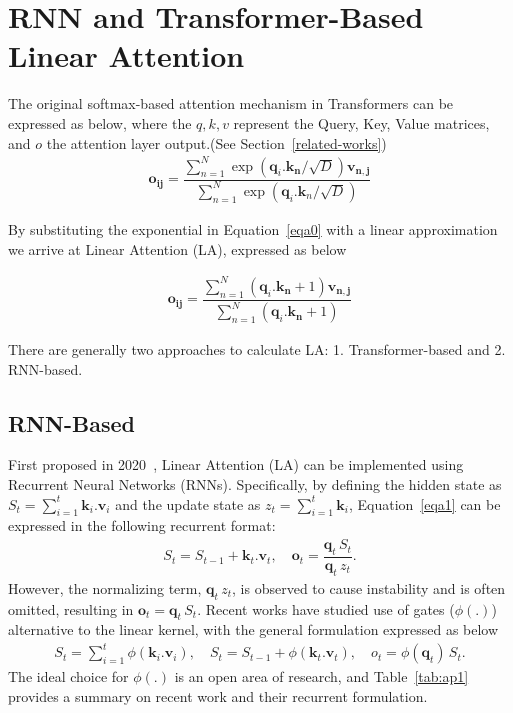 \newpage

\section{RNN and Transformer-Based Linear Attention}
\label{app:rnn}
The original softmax-based attention mechanism in Transformers can be expressed as below, where the $q,k,v$ represent the Query, Key, Value matrices, and $o$ the attention layer output.(See Section~\ref{related-works})
\begin{gather}
        \mathbf{o_{ij}} \!=\! \dfrac{\sum_{n=1}^{N}{\exp(\mathbf{q}_i.\mathbf{k_n}/\sqrt{D})\mathbf{v_{n,j}}}}{\sum_{n=1}^{N}{\exp(\mathbf{q}_i.\mathbf{k}_n/\sqrt{D})}}\label{eqa0}
\end{gather}

By substituting the exponential in Equation~\ref{eqa0} with a linear approximation we arrive at Linear Attention (LA), expressed as below

\begin{gather}
        \mathbf{o_{ij}} \!=\! \dfrac{\sum_{n=1}^{N}{(\mathbf{q}_i.\mathbf{k_n}+1)\mathbf{v_{n,j}}}}{\sum_{n=1}^{N}{(\mathbf{q}_i.\mathbf{k_n}+1)}}\label{eqa1}
\end{gather}

\par There are generally two approaches to calculate LA: 1. Transformer-based and 2. RNN-based.

\subsection{RNN-Based}
First proposed in 2020~\cite{pmlr-v119-katharopoulos20a}, Linear Attention (LA) can be implemented using Recurrent Neural Networks (RNNs). Specifically, by defining the hidden state as $S_t = \sum_{i=1}^t  \mathbf{k}_i.\mathbf{v}_i$ and the update state as $z_t = \sum_{i=1}^t  \mathbf{k}_i$, Equation~\ref{eqa1} can be expressed in the following recurrent format:
\begin{gather}
    S_t = S_{t-1} + \mathbf{k}_t.\mathbf{v}_t,\quad \mathbf{o}_t = \dfrac{\mathbf{q}_t\,S_t}{\mathbf{q}_t\,z_t}.
\end{gather}
However, the normalizing term, $\mathbf{q}_t\,z_t$, is observed to cause instability and is often omitted, resulting in $\mathbf{o}_t = \mathbf{q}_t\,S_t$. Recent works have studied use of gates ($\phi(.)$) alternative to the linear kernel, with the general formulation expressed as below
\begin{gather}
    S_t = \sum_{i=1}^t \phi({\mathbf{k}_i}.\mathbf{v}_i),\quad S_t = S_{t-1} +\phi({\mathbf{k}_t}.\mathbf{v}_t),\quad o_t =  \phi({\mathbf{q}_t})\,S_t.
\end{gather}
The ideal choice for $\phi(.)$ is an open area of research, and Table~\ref{tab:ap1} provides a summary on recent work and their recurrent formulation.

